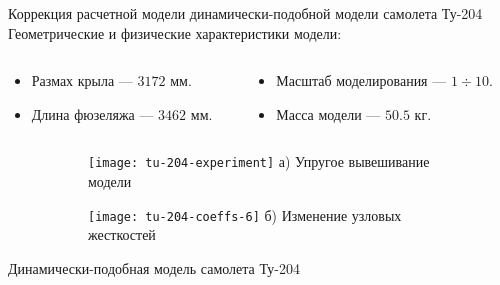 \begin{frame}{Коррекция расчетной модели динамически-подобной модели самолета Ту-204}
	Геометрические и физические характеристики модели:
	\begin{columns}
		\begin{column}{0.45\textwidth}
			\begin{itemize}
				\item Размах крыла --- $ 3172 $ мм.
				\item Длина фюзеляжа --- $ 3462 $ мм.
			\end{itemize}
		\end{column}
		\begin{column}{0.55\textwidth}
			\begin{itemize}
				\item Масштаб моделирования --- $ 1 \div 10 $.
				\item Масса модели --- $ 50.5 $ кг.
			\end{itemize}
		\end{column}
	\end{columns}
	\begin{center}
		\begin{figure}
			\small
			\begin{subfigure}[t]{0.49\textwidth}
				\centering
		     	\texttt{[image: tu-204-experiment]} 
		     	а) Упругое вывешивание модели
		    \end{subfigure}
	    	\hfill
		    \begin{subfigure}[t]{0.49\textwidth}
				\centering
				\texttt{[image: tu-204-coeffs-6]}
				б) Изменение узловых жесткостей
		    \end{subfigure}
		\end{figure}
		\vspace{1em}
		Динамически-подобная модель самолета Ту-204
	\end{center}
\end{frame}

